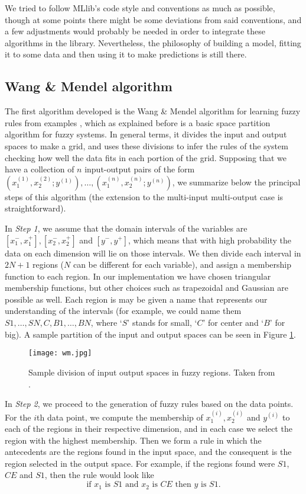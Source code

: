 We tried to follow MLlib's code style and conventions as much as possible, though at some points there might be some deviations from said conventions, and a few adjustments would probably be needed in order to integrate these algorithms in the library. Nevertheless, the philosophy of building a model, fitting it to some data and then using it to make predictions is still there.

\subsection{Wang \& Mendel algorithm}

The first algorithm developed is the Wang \& Mendel algorithm for learning fuzzy rules from examples \cite{wang1992generating}, which as explained before is a basic space partition algorithm for fuzzy systems. In general terms, it divides the input and output spaces to make a grid, and uses these divisions to infer the rules of the system checking how well the data fits in each portion of the grid. Supposing that we have a collection of $n$ input-output pairs of the form $(x_1^{(1)}, x_2^{(2)}; y^{(1)}),\dots, (x_1^{(n)}, x_2^{(n)}; y^{(n)})$, we summarize below the principal steps of this algorithm (the extension to the multi-input multi-output case is straightforward).

In \textit{Step 1}, we assume that the domain intervals of the variables are $[x_1^-,x_1^+], [x_2^-,x_2^+]$ and $[y^-,y^+]$, which means that with high probability the data on each dimension will lie on those intervals. We then divide each interval in $2N+1$ regions ($N$ can be different for each variable), and assign a membership function to each region. In our implementation we have chosen triangular membership functions, but other choices such as trapezoidal and Gaussian are possible as well. Each region is may be given a name that represents our understanding of the intervals (for example, we could name them $S1,\dots, SN, C, B1, \dots, BN$, where `$S$' stands for small, `$C$' for center and `$B$' for big). A sample partition of the input and output spaces can be seen in Figure \ref{fig:wm}.

\begin{figure}[h!]
\centering
\texttt{[image: wm.jpg]}
\caption{Sample division of input output spaces in fuzzy regions. Taken from \cite{wang1992generating}.}
\label{fig:wm}
\end{figure}

In \textit{Step 2}, we proceed to the generation of fuzzy rules based on the data points. For the $i$th data point, we compute the membership of $x_1^{(i)},x_2^{(i)}$ and $y^{(i)}$ to each of the regions in their respective dimension, and in each case we select the region with the highest membership. Then we form a rule in which the antecedents are the regions found in the input space, and the consequent is the region selected in the output space. For example, if the regions found were $S1$, $CE$ and $S1$, then the rule would look like
\begin{equation}\label{eq:rule}
  \text{if $x_1$ is $S1$ and $x_2$ is $CE$ then $y$ is $S1$}.
\end{equation}

